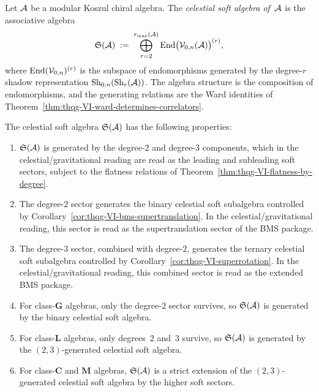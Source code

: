 \begin{definition}
Let $\mathcal{A}$ be a modular Koszul chiral algebra. The
\emph{celestial soft algebra of~$\mathcal{A}$} is the associative algebra
\begin{equation}%
\mathfrak{S}(\cA)
\;:=\;
\bigoplus_{r=2}^{r_{\max}(\cA)}
\End\bigl(\cV_{0,n}(\cA)\bigr)^{(r)},
\end{equation}
where $\operatorname{End}(\mathcal{V}_{0,n})^{(r)}$ is the subspace of endomorphisms
generated by the degree-$r$ shadow representation
$\operatorname{Sh}_{0,n}(\operatorname{Sh}_r(\mathcal{A}))$. The algebra structure is the
composition of endomorphisms, and the generating relations are
the Ward identities of
Theorem~\ref{thm:thqg-VI-ward-determines-correlators}.
\end{definition}

\begin{proposition}
The celestial soft algebra $\mathfrak{S}(\mathcal{A})$ has the following
properties:
\begin{enumerate}[label=\textup{(\roman*)}]
\item $\mathfrak{S}(\mathcal{A})$ is generated by the degree-$2$ and
 degree-$3$ components, which in the celestial/gravitational
 reading are read as the leading and subleading soft sectors,
 subject to the flatness relations of
 Theorem~\ref{thm:thqg-VI-flatness-by-degree}.
\item The degree-$2$ sector generates the binary celestial soft
 subalgebra controlled by
 Corollary~\ref{cor:thqg-VI-bms-supertranslation}. In the
 celestial/gravitational reading, this sector is read as the
 supertranslation sector of the BMS package.
\item The degree-$3$ sector, combined with degree-$2$, generates the
 ternary celestial soft subalgebra controlled by
 Corollary~\ref{cor:thqg-VI-superrotation}. In the
 celestial/gravitational reading, this combined sector is read as
 the extended BMS package.
\item For class-$\mathbf{G}$ algebras, only the degree-$2$ sector
 survives, so $\mathfrak{S}(\mathcal{A})$ is generated by the binary
 celestial soft algebra.
\item For class-$\mathbf{L}$ algebras, only degrees~$2$ and~$3$
 survive, so $\mathfrak{S}(\mathcal{A})$ is generated by the
 $(2,3)$-generated celestial soft algebra.
\item For class-$\mathbf{C}$ and $\mathbf{M}$ algebras,
 $\mathfrak{S}(\mathcal{A})$ is a strict extension of the
 $(2,3)$-generated celestial soft algebra by the higher soft
 sectors.
\end{enumerate}
\end{proposition}

